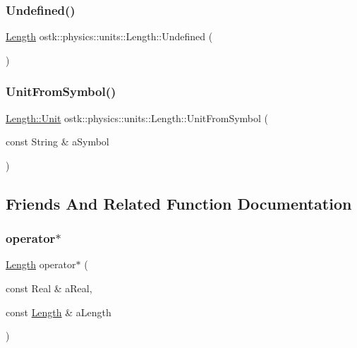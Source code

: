 \subsubsection{\texorpdfstring{Undefined()}{Undefined()}}
{\footnotesize\ttfamily \hyperlink{classostk_1_1physics_1_1units_1_1_length}{Length} ostk\+::physics\+::units\+::\+Length\+::\+Undefined (\begin{DoxyParamCaption}{ }\end{DoxyParamCaption})\hspace{0.3cm}{\ttfamily [static]}}

\mbox{\label{classostk_1_1physics_1_1units_1_1_length_a91418e40747b13b0e2b669ec55626afa}} 
\subsubsection{\texorpdfstring{Unit\+From\+Symbol()}{UnitFromSymbol()}}
{\footnotesize\ttfamily \hyperlink{classostk_1_1physics_1_1units_1_1_length_a2664470a7eedf5d45c88861fe69badea}{Length\+::\+Unit} ostk\+::physics\+::units\+::\+Length\+::\+Unit\+From\+Symbol (\begin{DoxyParamCaption}\item[{const String \&}]{a\+Symbol }\end{DoxyParamCaption})\hspace{0.3cm}{\ttfamily [static]}}



\subsection{Friends And Related Function Documentation}
\mbox{\label{classostk_1_1physics_1_1units_1_1_length_a72059ec2f1e930a0e75a3a808e434363}} 
\subsubsection{\texorpdfstring{operator$\ast$}{operator*}}
{\footnotesize\ttfamily \hyperlink{classostk_1_1physics_1_1units_1_1_length}{Length} operator$\ast$ (\begin{DoxyParamCaption}\item[{const Real \&}]{a\+Real,  }\item[{const \hyperlink{classostk_1_1physics_1_1units_1_1_length}{Length} \&}]{a\+Length }\end{DoxyParamCaption})\hspace{0.3cm}{\ttfamily [friend]}}

